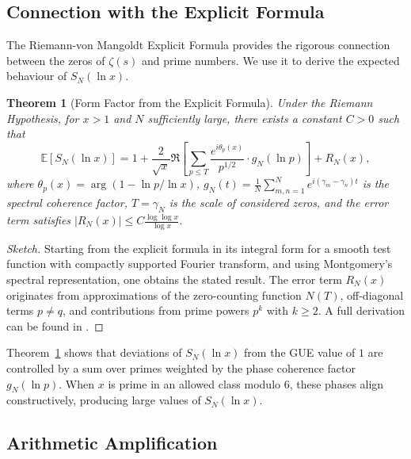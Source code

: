 \documentclass[12pt,a4paper]{article}
\theoremstyle{plain}
\newtheorem{theorem}{Theorem}[section]
\theoremstyle{definition}
\theoremstyle{remark}
\begin{document}
\subsection{Connection with the Explicit Formula}
\label{subsec:explicit_formula}

The Riemann-von Mangoldt Explicit Formula provides the rigorous connection between the zeros of \(\zeta(s)\) and prime numbers. We use it to derive the expected behaviour of \(S_N(\ln x)\).

\begin{theorem}[Form Factor from the Explicit Formula]
\label{thm:explicit}
Under the Riemann Hypothesis, for \(x > 1\) and \(N\) sufficiently large, there exists a constant \(C > 0\) such that
\begin{equation}
\mathbb{E}[S_N(\ln x)] = 1 + \frac{2}{\sqrt{x}} \Re\left[ \sum_{p \leq T} \frac{e^{i\theta_p(x)}}{p^{1/2}} \cdot g_N(\ln p) \right] + R_N(x),
\label{eq:explicit_form}
\end{equation}
where \(\theta_p(x) = \arg(1 - \ln p / \ln x)\), \(g_N(t) = \frac{1}{N}\sum_{m,n=1}^N e^{i(\gamma_m - \gamma_n)t}\) is the spectral coherence factor, \(T = \gamma_N\) is the scale of considered zeros, and the error term satisfies \(|R_N(x)| \leq C \frac{\log\log x}{\log x}\).
\end{theorem}

\begin{proof}[Sketch]
Starting from the explicit formula in its integral form for a smooth test function with compactly supported Fourier transform, and using Montgomery's spectral representation, one obtains the stated result. The error term \(R_N(x)\) originates from approximations of the zero-counting function \(N(T)\), off-diagonal terms \(p \neq q\), and contributions from prime powers \(p^k\) with \(k \geq 2\). A full derivation can be found in \cite{titchmarsh1986, montgomery1973}.
\end{proof}

Theorem~\ref{thm:explicit} shows that deviations of \(S_N(\ln x)\) from the GUE value of \(1\) are controlled by a sum over primes weighted by the phase coherence factor \(g_N(\ln p)\). When \(x\) is prime in an allowed class modulo 6, these phases align constructively, producing large values of \(S_N(\ln x)\).

\subsection{Arithmetic Amplification}
\label{subsec:amplification}
\end{document}
